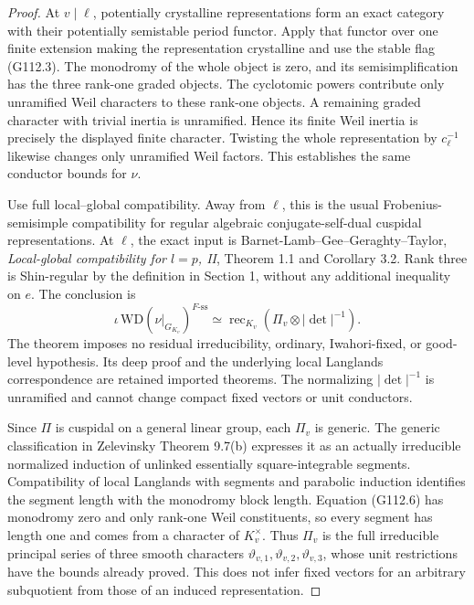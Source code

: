 \begin{proof}
At \(v\mid\ell\), potentially crystalline representations form an exact
category with their potentially semistable period functor.  Apply that
functor over one finite extension making the representation crystalline
and use the stable flag (G112.3).  The monodromy of the whole object is
zero, and its semisimplification has the three rank-one graded objects.
The cyclotomic powers contribute only unramified Weil characters to
these rank-one objects.  A remaining graded character with trivial
inertia is unramified.  Hence its finite Weil inertia is precisely the
displayed finite character.  Twisting the whole representation by
\(c_\ell^{-1}\) likewise changes only unramified Weil factors.  This
establishes the same conductor bounds for \(\nu\).

Use full local--global compatibility.  Away from \(\ell\), this is the
usual Frobenius-semisimple compatibility for regular algebraic
conjugate-self-dual cuspidal representations.  At \(\ell\), the exact
input is Barnet-Lamb--Gee--Geraghty--Taylor, \emph{Local-global
compatibility for \(l=p\), II}, Theorem 1.1 and Corollary 3.2.
Rank three is Shin-regular by the definition in Section 1, without any
additional inequality on \(e\).  The conclusion is
\[
 \iota\,\mathrm{WD}(\nu|_{G_{K_v}})^{F\text{-ss}}
       \simeq \operatorname{rec}_{K_v}(\Pi_v\otimes|\det|^{-1}).
       \tag{G112.6}
\]
The theorem imposes no residual irreducibility, ordinary, Iwahori-fixed,
or good-level hypothesis.  Its deep proof and the underlying local
Langlands correspondence are retained imported theorems.  The
normalizing \(|\det|^{-1}\) is unramified and cannot change compact
fixed vectors or unit conductors.

Since \(\Pi\) is cuspidal on a general linear group, each \(\Pi_v\) is
generic.  The generic classification in Zelevinsky Theorem 9.7(b)
expresses it as an actually irreducible normalized induction of
unlinked essentially square-integrable segments.  Compatibility of
local Langlands with segments and parabolic induction identifies the
segment length with the monodromy block length.  Equation (G112.6)
has monodromy zero and only rank-one Weil constituents, so every
segment has length one and comes from a character of \(K_v^\times\).
Thus \(\Pi_v\) is the full irreducible principal series of three smooth
characters \(\vartheta_{v,1},\vartheta_{v,2},\vartheta_{v,3}\), whose
unit restrictions have the bounds already proved.  This does not
infer fixed vectors for an arbitrary subquotient from those of an
induced representation.


\end{proof}
